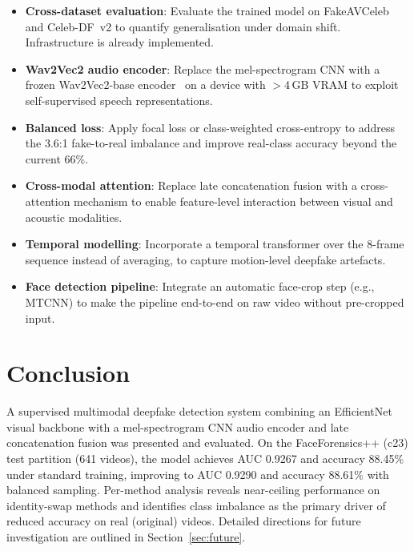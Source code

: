 \documentclass[conference]{IEEEtran}
\begin{document}
\begin{itemize}
  \item \textbf{Cross-dataset evaluation}: Evaluate the trained model on
        FakeAVCeleb~\cite{fakeavceleb2022} and Celeb-DF~v2 to quantify
        generalisation under domain shift. Infrastructure is already implemented.
  \item \textbf{Wav2Vec2 audio encoder}: Replace the mel-spectrogram CNN with
        a frozen Wav2Vec2-base encoder~\cite{baevski2020wav2vec2} on a device
        with $>$4\,GB VRAM to exploit self-supervised speech representations.
  \item \textbf{Balanced loss}: Apply focal loss or class-weighted cross-entropy
        to address the 3.6:1 fake-to-real imbalance and improve real-class accuracy
        beyond the current 66\%.
  \item \textbf{Cross-modal attention}: Replace late concatenation fusion with a
        cross-attention mechanism to enable feature-level interaction between
        visual and acoustic modalities.
  \item \textbf{Temporal modelling}: Incorporate a temporal transformer over
        the 8-frame sequence instead of averaging, to capture motion-level
        deepfake artefacts.
  \item \textbf{Face detection pipeline}: Integrate an automatic face-crop
        step (e.g., MTCNN) to make the pipeline end-to-end on raw video without
        pre-cropped input.
\end{itemize}

\section{Conclusion}
\label{sec:conclusion}

A supervised multimodal deepfake detection system combining an EfficientNet visual 
backbone with a mel-spectrogram CNN audio encoder and late concatenation fusion was 
presented and evaluated. On the FaceForensics++ (c23) test partition (641 videos), 
the model achieves AUC 0.9267 and accuracy 88.45\% under standard training, improving 
to AUC 0.9290 and accuracy 88.61\% with balanced sampling. Per-method analysis reveals 
near-ceiling performance on identity-swap methods and identifies class imbalance as the
primary driver of reduced accuracy on real (original) videos.
Detailed directions for future investigation are outlined in Section~\ref{sec:future}.
\end{document}
